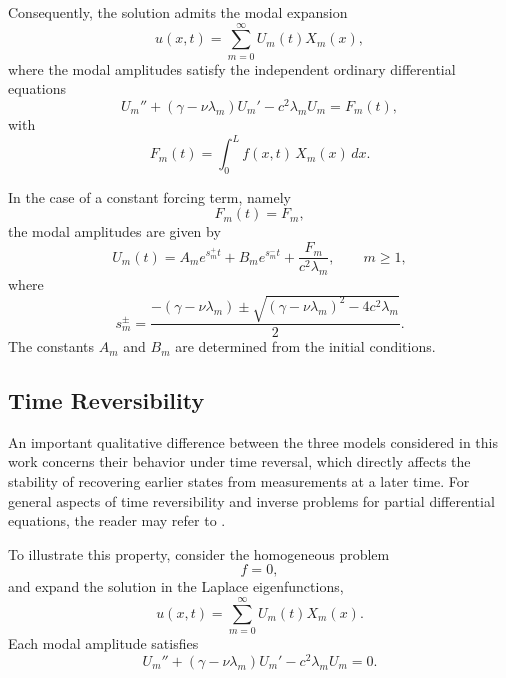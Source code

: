 \documentclass{Configuration_Files/PoliMi3i_thesis}
\begin{document}
Consequently, the solution admits the modal expansion
\begin{equation*}
u(x,t)
=
\sum_{m=0}^{\infty}
U_m(t)X_m(x),
\end{equation*}
where the modal amplitudes satisfy the independent ordinary differential equations
\begin{equation} \label{eq:modal_ode}
U_m''
+
\left(
\gamma
-
\nu\lambda_m
\right)
U_m'
-
c^2\lambda_mU_m
=
F_m(t),
\end{equation}
with
\begin{equation*}
F_m(t)
=
\int_0^L
f(x,t)\,
X_m(x)\,dx.
\end{equation*}

In the case of a constant forcing term, namely
\begin{equation*}
F_m(t)=F_m,
\end{equation*}
the modal amplitudes are given by
\begin{equation*}
U_m(t)
=
A_me^{s_m^+t}
+
B_me^{s_m^-t}
+
\frac{F_m}{c^2\lambda_m},
\qquad
m\ge1,
\end{equation*}
where
\begin{equation*}
s_m^\pm
=
\frac{
-\left(\gamma-\nu\lambda_m\right)
\pm
\sqrt{
\left(\gamma-\nu\lambda_m\right)^2
-
4c^2\lambda_m
}
}{2}.
\end{equation*}
The constants $A_m$ and $B_m$ are determined from the initial conditions.

\subsection{Time Reversibility}

An important qualitative difference between the three models considered in this work concerns their behavior under time reversal, which directly affects the stability of recovering earlier states from measurements at a later time. For general aspects of time reversibility and inverse problems for partial differential equations, the reader may refer to \cite{isakov_inverse_2006}.

To illustrate this property, consider the homogeneous problem
\begin{equation*}
f=0,
\end{equation*}
and expand the solution in the Laplace eigenfunctions,
\begin{equation*}
u(x,t)
=
\sum_{m=0}^{\infty}
U_m(t)X_m(x).
\end{equation*}
Each modal amplitude satisfies
\begin{equation*}
U_m''
+
(\gamma-\nu\lambda_m)U_m'
-
c^2\lambda_mU_m
=
0.
\end{equation*}
\end{document}
